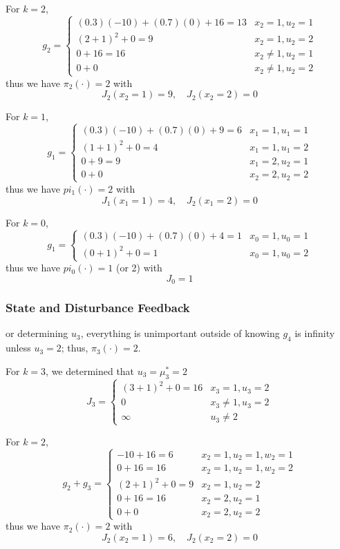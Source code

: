 \documentclass[]{article}
\begin{document}
For $k=2$,\[
    g_2 = \begin{cases}
        (0.3)(-10) + (0.7)(0) + 16 = 13 &x_2=1, u_2 = 1\\
        (2+1)^2 + 0 = 9 &x_2 = 1, u_2 = 2\\
        0 + 16 = 16 &x_2\neq 1, u_2 = 1\\
        0 + 0 &x_2 \neq 1, u_2 = 2
    \end{cases}
\] thus we have $\pi_2(\cdot) = 2$ with \[
    J_2(x_2 = 1) = 9, \quad J_2(x_2 = 2) = 0
\]

For $k=1$, \[
    g_1 = \begin{cases}
        (0.3)(-10) + (0.7)(0) + 9 = 6 &x_1=1, u_1 = 1\\
        (1+1)^2 + 0 = 4 &x_1 = 1, u_1 = 2\\
        0 + 9 = 9 &x_1 = 2, u_2 = 1\\
        0 + 0 &x_2 =2, u_2 = 2
    \end{cases}
\] thus we have $pi_1(\cdot) = 2$ with \[
    J_1(x_1 = 1) = 4, \quad J_2(x_1 = 2) = 0
\]

For $k=0$, \[
    g_1 = \begin{cases}
        (0.3)(-10) + (0.7)(0) + 4 = 1 &x_0=1, u_0 = 1\\
        (0+1)^2 + 0 = 1 &x_0 = 1, u_0 = 2
    \end{cases}
\] thus we have $pi_0(\cdot) = 1$  (or 2) with \[
    J_0 = 1
\]

\subsubsection{State and Disturbance Feedback}
or determining $u_3$, everything is unimportant outside of knowing $g_4$ is infinity unless $u_3 = 2$; thus, $\pi_3(\cdot) = 2$.

For $k=3$, we determined that $u_3 = \mu_3^* = 2$ \[
    J_3 = \begin{cases}
        (3+1)^2 + 0=16& x_3=1, u_3 = 2\\
        0 &x_3 \neq 1, u_3 = 2\\
        \infty & u_3 \neq 2
    \end{cases}
\]

For $k=2$,\[
    g_2 + g_3 = \begin{cases}
        -10 + 16 = 6 &x_2=1, u_2 = 1, w_2 = 1\\
        0 + 16 = 16 &x_2=1, u_2 = 1, w_2 = 2\\
        (2+1)^2 + 0 = 9 &x_2 = 1, u_2 = 2\\
        0 + 16 = 16 &x_2= 2, u_2 = 1\\
        0 + 0 &x_2 = 2, u_2 = 2
    \end{cases}
\] thus we have $\pi_2(\cdot) = 2$ with \[
    J_2(x_2 = 1) = 6, \quad J_2(x_2 = 2) = 0
\]
\end{document}
